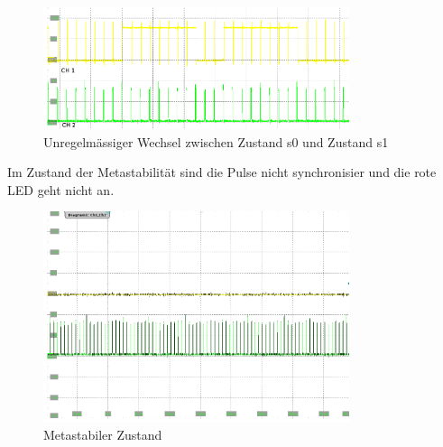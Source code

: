 \begin{figure}[H]
	\centering
	\includegraphics[width=0.8\textwidth]{images/metastability/synchron_eng_3.png}
	\caption{Unregelmässiger Wechsel zwischen Zustand s0 und Zustand s1}
	\label{fig.metastabil.Ergebnis_2}
\end{figure}

\newpage
Im Zustand der Metastabilität sind die Pulse nicht synchronisier und die rote LED geht nicht an.\\

\begin{figure}[H]
	\centering
	\includegraphics[width=0.8\textwidth]{images/metastability/asynchron_en_.png}
	\caption{Metastabiler Zustand}
	\label{fig.metastabil.Metastabil}
\end{figure}


